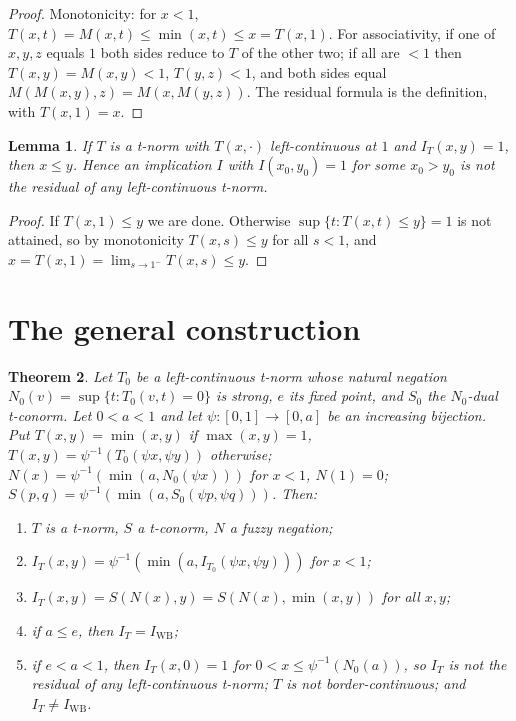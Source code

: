 \documentclass[11pt]{amsart}
\newtheorem{theorem}{Theorem}
\newtheorem{lemma}[theorem]{Lemma}
\theoremstyle{remark}
\newcommand{\IWB}{I_{\mathrm{WB}}}
\begin{document}
\begin{proof}
Monotonicity: for $x<1$, $T(x,t)=M(x,t)\le\min(x,t)\le x=T(x,1)$. For
associativity, if one of $x,y,z$ equals $1$ both sides reduce to $T$ of the
other two; if all are $<1$ then $T(x,y)=M(x,y)<1$, $T(y,z)<1$, and both sides
equal $M(M(x,y),z)=M(x,M(y,z))$. The residual formula is the definition, with
$T(x,1)=x$.
\end{proof}

\begin{lemma}\label{lem:lc}
If $T$ is a t-norm with $T(x,\cdot)$ left-continuous at $1$ and
$I_T(x,y)=1$, then $x\le y$. Hence an implication $I$ with $I(x_0,y_0)=1$ for
some $x_0>y_0$ is not the residual of any left-continuous t-norm.
\end{lemma}

\begin{proof}
If $T(x,1)\le y$ we are done. Otherwise $\sup\{t:T(x,t)\le y\}=1$ is not
attained, so by monotonicity $T(x,s)\le y$ for all $s<1$, and
$x=T(x,1)=\lim_{s\to1^-}T(x,s)\le y$.
\end{proof}

\section{The general construction}

\begin{theorem}\label{thm:C}
Let $T_0$ be a left-continuous t-norm whose natural negation
$N_0(v)=\sup\{t: T_0(v,t)=0\}$ is strong, $e$ its fixed point, and $S_0$ the
$N_0$-dual t-conorm. Let $0<a<1$ and let $\psi:[0,1]\to[0,a]$ be an increasing
bijection. Put $T(x,y)=\min(x,y)$ if $\max(x,y)=1$,
$T(x,y)=\psi^{-1}(T_0(\psi x,\psi y))$ otherwise;
$N(x)=\psi^{-1}(\min(a,N_0(\psi x)))$ for $x<1$, $N(1)=0$;
$S(p,q)=\psi^{-1}(\min(a,S_0(\psi p,\psi q)))$. Then:
\begin{enumerate}
\item $T$ is a t-norm, $S$ a t-conorm, $N$ a fuzzy negation;
\item $I_T(x,y)=\psi^{-1}(\min(a,I_{T_0}(\psi x,\psi y)))$ for $x<1$;
\item $I_T(x,y)=S(N(x),y)=S(N(x),\min(x,y))$ for all $x,y$;
\item if $a\le e$, then $I_T=\IWB$;
\item if $e<a<1$, then $I_T(x,0)=1$ for $0<x\le\psi^{-1}(N_0(a))$, so $I_T$
  is not the residual of any left-continuous t-norm; $T$ is not
  border-continuous; and $I_T\ne\IWB$.
\end{enumerate}
\end{theorem}
\end{document}
